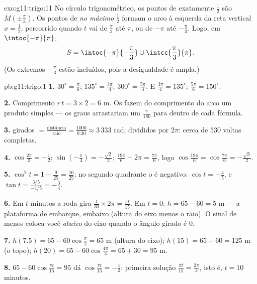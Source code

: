 \begin{solution}{exo:g11:trigo:11}
No círculo trigonométrico, os pontos de  exatamente $\frac12$ são
$M\!\left(\pm\frac\pi3\right)$. Os pontos de  \emph{no máximo}
$\frac12$ formam o arco à esquerda da reta vertical $x = \frac12$,
percorrido quando $t$ vai de $\frac\pi3$ até $\pi$, ou de $-\pi$ até
$-\frac\pi3$. Logo, em $\intoc{-\pi}{\pi}$:
\[
S = \intoc{-\pi}{-\frac{\pi}{3}} \cup \intcc{\frac{\pi}{3}}{\pi}.
\]
(Os extremos $\pm\frac\pi3$ estão incluídos, pois a desigualdade é
ampla.)
\end{solution}

\begin{solution}{pb:g11:trigo:1}
\textbf{1.} $30^\circ = \frac{\pi}{6}$; $135^\circ =
\frac{3\pi}{4}$; $300^\circ = \frac{5\pi}{3}$. E
$\frac{3\pi}{4} = 135^\circ$; $\frac{5\pi}{6} = 150^\circ$.

\textbf{2.} Comprimento $r\,t = 3 \times 2 = 6$ m. Os 
fazem do comprimento do arco um produto simples --- os graus
arrastariam um $\frac{\pi}{180}$ para dentro de cada fórmula.

\textbf{3.}  girados $= \frac{\text{distância}}
{\text{raio}} = \frac{1000}{0.30} \approx 3\,333$ rad;
divididos por $2\pi$: cerca de $530$ voltas completas.

\textbf{4.} $\cos\frac{2\pi}{3} = -\frac12$;
$\sin\left(-\frac\pi4\right) = -\frac{\sqrt2}{2}$;
$\frac{19\pi}{6} - 2\pi = \frac{7\pi}{6}$, logo
$\cos\frac{19\pi}{6} = \cos\frac{7\pi}{6} = -\frac{\sqrt3}{2}$.

\textbf{5.} $\cos^2 t = 1 - \frac{9}{25} = \frac{16}{25}$; no
segundo quadrante o  é negativo: $\cos t = -\frac45$, e
$\tan t = \frac{3/5}{-4/5} = -\frac34$.

\textbf{6.} Em $t$ minutos a roda gira
$\frac{t}{30} \times 2\pi = \frac{\pi t}{15}$. Em $t = 0$:
$h = 65 - 60 = 5$ m --- a plataforma de embarque, embaixo
(altura do eixo menos o raio). O sinal de menos coloca você
\emph{abaixo} do eixo quando o ângulo girado é $0$.

\textbf{7.} $h(7.5) = 65 - 60\cos\frac{\pi}{2} = 65$ m (altura
do eixo); $h(15) = 65 + 60 = 125$ m (o topo);
$h(20) = 65 - 60\cos\frac{4\pi}{3} = 65 + 30 = 95$ m.

\textbf{8.} $65 - 60\cos\frac{\pi t}{15} = 95$ dá
$\cos\frac{\pi t}{15} = -\frac12$: primeira solução
$\frac{\pi t}{15} = \frac{2\pi}{3}$, isto é, $t = 10$ minutos.


\end{solution}
